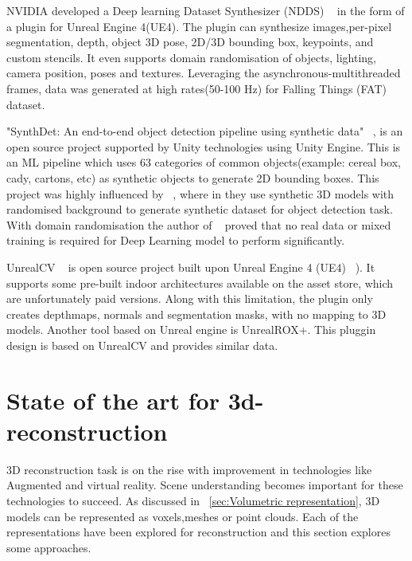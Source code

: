 NVIDIA developed a Deep learning Dataset Synthesizer (NDDS) ~\cite{to2018ndds} in the form of a plugin for Unreal Engine 4(UE4).
The plugin can synthesize images,per-pixel segmentation, depth, object 3D pose, 2D/3D bounding box, keypoints, and custom stencils.
It even supports domain randomisation of objects, lighting, camera position, poses and textures.
Leveraging the asynchronous-multithreaded frames, data was generated at high rates(50-100 Hz) for Falling Things (FAT) ~\cite{tremblay2018falling} dataset.

"SynthDet: An end-to-end object detection pipeline using synthetic data" ~\cite{synthdet2020}, is an open source project supported by Unity technologies using Unity Engine.
This is an ML pipeline which uses 63 categories of common objects(example: cereal box, cady, cartons, etc) as synthetic objects to generate 2D bounding boxes.
This project was highly influenced by ~\cite{hinterstoisser2019annotation}, where in they use synthetic 3D models with randomised background to generate synthetic dataset for object detection task.
With domain randomisation the author of ~\cite{hinterstoisser2019annotation} proved that no real data or mixed training is required for Deep Learning model to perform significantly.

UnrealCV ~\cite{qiu2017unrealcv} is open source project built upon Unreal Engine 4 (UE4) ~\cite{unrealengine}).
It supports some pre-built indoor architectures available on the asset store, which are unfortunately paid versions.
Along with this limitation, the plugin only creates depthmaps, normals and segmentation masks, with no mapping to 3D models.
Another tool based on Unreal engine is UnrealROX+\cite{martinezgonzalez2021unrealrox}.
This pluggin design is based on UnrealCV and provides similar data.

\section{State of the art for 3d-reconstruction}\label{sec:state_of_the_art}

3D reconstruction task is on the rise with improvement in technologies like Augmented and virtual reality.
Scene understanding becomes important for these technologies to succeed.
As discussed in ~\ref{sec:Volumetric representation}, 3D models can be represented as voxels,meshes or point clouds.
Each of the representations have been explored for reconstruction and this section explores some approaches.

